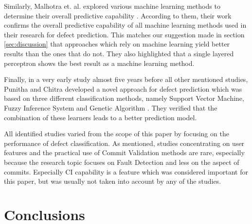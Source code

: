 Similarly, Malhotra et. al. explored various machine learning methods to determine their overall predictive capability \cite{Malhotra2017}. According to them, their work confirms the overall predictive capability of all machine learning methods used in their research for defect prediction. This matches our suggestion made in section \ref{sec:discussion} that approaches which rely on machine learning yield better results than the ones that do not. They also highlighted that a single layered perceptron shows the best result as a machine learning method.

Finally, in a very early study almost five years before all other mentioned studies, Punitha and Chitra developed a novel approach for defect prediction which was based on three different classification methods, namely Support Vector Machine, Fuzzy Inference System and Genetic Algorithm \cite{Punitha2013}. They verified that the combination of these learners leads to a better prediction model.

All identified studies varied from the scope of this paper by focusing on the performance of defect classification. As mentioned, studies concentrating on user features and the practical use of Commit Validation methods are rare, especially because the research topic focuses on Fault Detection and less on the aspect of commits. Especially CI capability is a feature which was considered important for this paper, but was usually not taken into account by any of the studies.


\section{Conclusions}
\label{sec:conclusions}


